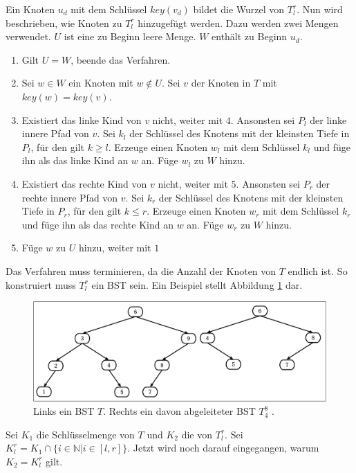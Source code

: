 \documentclass[a4paper,12pt]{article}
\begin{document}
\noindent Ein Knoten $u_d$ mit dem Schlüssel $\mathit{key}(v_d)$ bildet die Wurzel von $T^r_l$. Nun wird beschrieben, wie Knoten zu $T^r_l$ hinzugefügt werden.
Dazu werden zwei Mengen verwendet. $U$ ist eine zu Beginn leere Menge. $W$ enthält zu Beginn $u_d$.
\begin{enumerate}
	\item Gilt $U = W$, beende das Verfahren.
	\item Sei $w \in W$ ein Knoten mit $w \notin U$.  Sei $v$ der Knoten in $T$ mit \mbox{$\mathit{key}(w ) = \mathit{key}(v)$}.  
	\item Existiert das linke Kind von $v$ nicht, weiter mit $4$. Ansonsten sei  $P_l$ der linke innere Pfad von $v$. Sei $k_l$ der Schlüssel des Knotens mit der kleinsten Tiefe in $P_l$, für den gilt $k \geq l$. Erzeuge einen Knoten $w_l$ mit dem Schlüssel $k_l$ und füge ihn als das linke Kind an $w$ an. Füge $w_l$ zu $W$ hinzu.
	\item Existiert das rechte Kind von $v$ nicht, weiter mit $5$. Ansonsten sei $P_r$ der rechte innere Pfad von $v$. Sei $k_r$ der Schlüssel des Knotens mit der kleinsten Tiefe in $P_r$, für den gilt  $k \leq r$. Erzeuge einen Knoten $w_r$ mit dem Schlüssel $k_r$ und füge ihn als das rechte Kind an $w$ an. Füge $w_r$ zu $W$ hinzu.	
	\item Füge $w$ zu $U$ hinzu, weiter mit $1$
\end{enumerate}
Das Verfahren muss terminieren, da die Anzahl der Knoten von $T$ endlich ist. So konstruiert muss $T^r_l$ ein BST sein. Ein Beispiel stellt Abbildung \ref{fig:T_r_l} dar. 
\begin{figure}[H]
	\centering
	\includegraphics[width= 1\textwidth]{Medien/DynOpt/T_r_l}
	\caption{Links ein BST $T$. Rechts ein davon abgeleiteter BST $T^8_4$ .  }
	\label{fig:T_r_l}
\end{figure}

\noindent Sei $K_1$ die Schlüsselmenge von $T$ und $K_2$ die von $T^r_l$. Sei ${K^r_l = K_1 \cap \{i \in \mathbb{N}\vert i \in \left[l,r\right] \}}$. Jetzt wird noch darauf eingegangen, warum $K_2 = K^r_l$ gilt. \\
\end{document}
